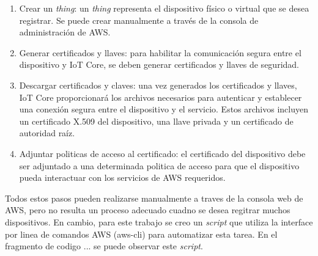 \begin{enumerate}
	\item Crear un \textit{thing}: un \textit{thing} representa el dispositivo físico o virtual que se desea registrar. Se puede crear manualmente a través de la consola de administración de AWS.
	\item Generar certificados y llaves: para habilitar la comunicación segura entre el dispositivo y IoT Core, se deben generar certificados y llaves de seguridad.
	\item Descargar certificados y claves: una vez generados los certificados y llaves, IoT Core proporcionará los archivos necesarios para autenticar y establecer una conexión segura entre el dispositivo y el servicio. Estos archivos incluyen un certificado X.509 \cite{x509_info} del dispositivo, una llave privada y un certificado de autoridad raíz.
	\item Adjuntar politicas de acceso al certificado: el certificado del dispositivo debe ser adjuntado a una determinada politica de acceso para que el dispositivo pueda interactuar con los servicios de AWS requeridos.
\end{enumerate}

Todos estos pasos pueden realizarse manualmente a traves de la consola web de AWS, pero no resulta un proceso adecuado cuadno se desea regitrar muchos dispositivos. En cambio, para este trabajo se creo un \textit{script} que utiliza la interface por linea de comandos AWS (aws-cli) \cite{awscli_info} para automatizar esta tarea. En el fragmento de codigo ... se puede observar este \textit{script}.

